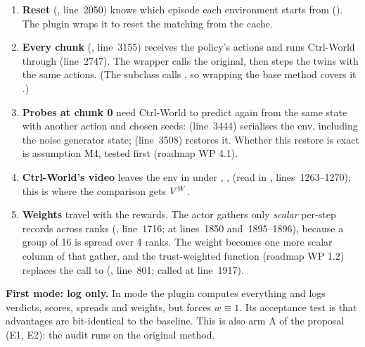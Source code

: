 \begin{enumerate}
\item \textbf{Reset} (, line~2050) knows which episode each environment starts from (). The plugin wraps it to reset the matching  from the cache.
\item \textbf{Every chunk} (, line~3155) receives the policy's actions  and runs Ctrl-World through  (line~2747). The wrapper calls the original, then steps the twins with the same actions. (The subclass  calls , so wrapping the base method covers it \chk.)
\item \textbf{Probes at chunk 0} need Ctrl-World to predict again from the same state with another action and chosen seeds:  (line~3444) serialises the env, including the noise generator state;  (line~3508) restores it. Whether this restore is exact is assumption M4, tested first (roadmap WP 4.1).
\item \textbf{Ctrl-World's video} leaves the env in  under , ,  (read in , lines~1263--1270); this is where the comparison gets $V^{W}$.
\item \textbf{Weights} travel with the rewards. The actor gathers only \emph{scalar} per-step records across ranks (, line~1716;  at lines~1850 and~1895--1896), because a group of 16 is spread over 4 ranks. The weight becomes one more scalar column of that gather, and the trust-weighted function (roadmap WP 1.2) replaces the call to  (, line~801; called at line~1917).
\end{enumerate}

\textbf{First mode: log only.} In  mode the plugin computes everything and logs verdicts, scores, spreads and weights, but forces $w\equiv1$. Its acceptance test is that advantages are bit-identical to the baseline. This is also arm A of the proposal (E1, E2): the audit runs on the original method.

